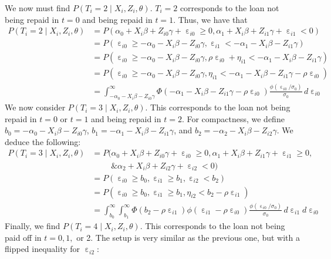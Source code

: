 \documentclass[12pt]{article}
\DeclareMathOperator{\eps}{\varepsilon}
\begin{document}
We now must find $P(T_i = 2 \mid X_i, Z_i, \theta)$. $T_i = 2$ corresponds to the loan not being repaid in $t = 0$ and being repaid in $t = 1$. Thus, we have that
\begin{align*}
    P(T_i = 2 \mid X_i, Z_i, \theta) &= P(\alpha_0 + X_i \beta + Z_{i0} \gamma + \eps_{i0} \geq 0, \alpha_1 + X_i \beta + Z_{i1} \gamma + \eps_{i1} < 0)\\
    &= P( \eps_{i0} \geq -\alpha_0 - X_i \beta - Z_{i0} \gamma,  \eps_{i1} < -\alpha_1 - X_i \beta - Z_{i1} \gamma)\\
    &= P( \eps_{i0} \geq -\alpha_0 - X_i \beta - Z_{i0} \gamma,  \rho \eps_{i0} + \eta_{i1} < -\alpha_1 - X_i \beta - Z_{i1} \gamma)\\
    &= P( \eps_{i0} \geq -\alpha_0 - X_i \beta - Z_{i0} \gamma,   \eta_{i1} < -\alpha_1 - X_i \beta - Z_{i1}\gamma -\rho \eps_{i0} )\\
    &= \int_{-\alpha_0 - X_i\beta - Z_{i0}\gamma}^{\infty} \Phi(-\alpha_1 - X_i \beta - Z_{i1}\gamma - \rho \eps_{i0}) \frac{\phi(\eps_{i0}/\sigma_0)}{\sigma_0} \, d \eps_{i0}
\end{align*}
We now consider $P(T_i = 3 \mid X_i, Z_i, \theta)$. This corresponds to the loan not being repaid in $t = 0$ or $t=1$ and being repaid in $t = 2$. For compactness, we define $b_0 = - \alpha_0 - X_i \beta - Z_{i0}\gamma$, $b_1 = - \alpha_1 - X_i \beta - Z_{i1}\gamma$, and $b_2 = - \alpha_2 - X_i \beta - Z_{i2}\gamma$. We deduce the following:
\begin{align*}
    P(T_i = 3 \mid X_i, Z_i, \theta) &= P(\alpha_0 + X_i \beta + Z_{i0} \gamma + \eps_{i0} \geq 0, \alpha_1 + X_i \beta + Z_{i1} \gamma + \eps_{i1} \geq 0, \\
    &\qquad \text{ \& } \alpha_2 + X_i \beta + Z_{i2} \gamma + \eps_{i2} < 0 )\\
    &= P( \eps_{i0} \geq b_0,  \eps_{i1} \geq b_1, \eps_{i2}< b_2)\\
    &= P( \eps_{i0} \geq b_0,  \eps_{i1} \geq b_1, \eta_{i2} < b_2 - \rho \eps_{i1})\\
    &= \int_{b_0}^{\infty} \int_{b_1}^{\infty} \Phi(b_2 - \rho \eps_{i1})\phi(\eps_{i1} - \rho \eps_{i0}) \frac{\phi(\eps_{i0}/\sigma_0)}{\sigma_0} \, d \eps_{i1} d \eps_{i0}
\end{align*}
Finally, we find $P(T_i = 4 \mid X_i, Z_i, \theta)$. This corresponds to the loan not being paid off in $t = 0, 1,$ or 2. The setup is very similar as the previous one, but with a flipped inequality for $\eps_{i2}$:
\end{document}

